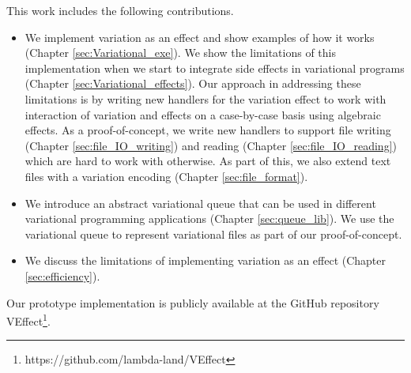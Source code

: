 This work includes the following contributions. 
%
\begin{itemize}
  \item We implement variation as an effect and show examples of how it works (Chapter \ref{sec:Variational_exe}). We show the limitations of this implementation when we start to integrate side effects in variational programs (Chapter \ref{sec:Variational_effects}). Our approach in addressing these limitations is by writing new handlers for the variation effect to work with interaction of variation and effects on a case-by-case basis using algebraic effects. As a proof-of-concept, we write new handlers to support file writing (Chapter \ref{sec:file_IO_writing}) and reading (Chapter \ref{sec:file_IO_reading}) which are hard to work with otherwise. As part of this, we also extend text files with a variation encoding (Chapter \ref{sec:file_format}).
  \item We introduce an abstract variational queue that can be used in different variational programming applications (Chapter \ref{sec:queue_lib}). We use the variational queue to represent variational files as part of our proof-of-concept. 
  \item We discuss the limitations of implementing variation as an effect (Chapter \ref{sec:efficiency}).
\end{itemize}
Our prototype implementation is publicly available at the GitHub repository VEffect\footnote{https://github.com/lambda-land/VEffect}. 

